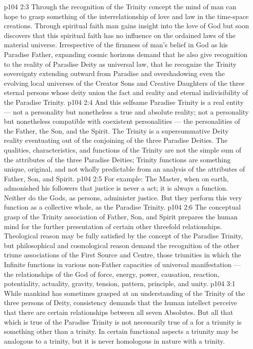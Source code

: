 \vs p104 2:3 Through the recognition of the Trinity concept the mind of man can hope to grasp something of the interrelationship of love and law in the time\hyp{}space creations. Through spiritual faith man gains insight into the love of God but soon discovers that this spiritual faith has no influence on the ordained laws of the material universe. Irrespective of the firmness of man’s belief in God as his Paradise Father, expanding cosmic horizons demand that he also give recognition to the reality of Paradise Deity as universal law, that he recognize the Trinity sovereignty extending outward from Paradise and overshadowing even the evolving local universes of the Creator Sons and Creative Daughters of the three eternal persons whose deity union  the fact and reality and eternal indivisibility of the Paradise Trinity.
\vs p104 2:4 And this selfsame Paradise Trinity is a real entity --- not a personality but nonetheless a true and absolute reality; not a personality but nonetheless compatible with coexistent personalities --- the personalities of the Father, the Son, and the Spirit. The Trinity is a supersummative Deity reality eventuating out of the conjoining of the three Paradise Deities. The qualities, characteristics, and functions of the Trinity are not the simple sum of the attributes of the three Paradise Deities; Trinity functions are something unique, original, and not wholly predictable from an analysis of the attributes of Father, Son, and Spirit.
\vs p104 2:5 For example: The Master, when on earth, admonished his followers that justice is never a  act; it is always a  function. Neither do the Gods, as persons, administer justice. But they perform this very function as a collective whole, as the Paradise Trinity.
\vs p104 2:6 The conceptual grasp of the Trinity association of Father, Son, and Spirit prepares the human mind for the further presentation of certain other threefold relationships. Theological reason may be fully satisfied by the concept of the Paradise Trinity, but philosophical and cosmological reason demand the recognition of the other triune associations of the First Source and Centre, those triunities in which the Infinite functions in various non\hyp{}Father capacities of universal manifestation --- the relationships of the God of force, energy, power, causation, reaction, potentiality, actuality, gravity, tension, pattern, principle, and unity.
\vs p104 3:1 While mankind has sometimes grasped at an understanding of the Trinity of the three persons of Deity, consistency demands that the human intellect perceive that there are certain relationships between all seven Absolutes. But all that which is true of the Paradise Trinity is not necessarily true of a  for a triunity is something other than a trinity. In certain functional aspects a triunity may be analogous to a trinity, but it is never homologous in nature with a trinity.
